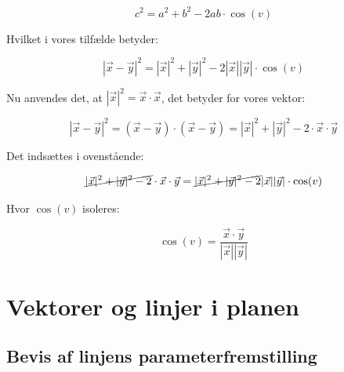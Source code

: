 \documentclass{article}
\makeatletter
\newenvironment{proofw}{\par
  \pushQED{\qed}%
  \normalfont \topsep6\p@\@plus6\p@\relax
  \trivlist
  \item[]\ignorespaces
}{%
  \popQED\endtrivlist\@endpefalse
}
\makeatother
\begin{document}
\begin{proofw}
$$
    c^2=a^2+b^2-2ab \cdot \cos(v)
$$

Hvilket i vores tilfælde betyder:

$$
    |\vec{x}-\vec{y}|^2=|\vec{x}|^2+|\vec{y}|^2-2|\vec{x}||\vec{y}| \cdot \cos(v)
$$

Nu anvendes det, at $|\vec{x}|^2=\vec{x} \cdot \vec{x}$, det betyder for vores vektor:

$$
    |\vec{x}-\vec{y}|^2=(\vec{x}-\vec{y})\cdot (\vec{x}-\vec{y})
    =|\vec{x}|^2+|\vec{y}|^2-2 \cdot \vec{x}\cdot \vec{y}
$$

Det indsættes i ovenstående:

$$
\cancel{|\vec{x}|^2+|\vec{y}|^2-2} \cdot \vec{x}\cdot \vec{y}
=\cancel{|\vec{x}|^2+|\vec{y}|^2-2}|\vec{x}||\vec{y}| \cdot \cos(v)
$$

Hvor $\cos(v)$ isoleres:

$$
    \cos(v)=\frac{
        \vec{x} \cdot \vec{y}
    }{
        |\vec{x}||\vec{y}|
    }
$$
\end{proofw}

\section{Vektorer og linjer i planen}

\subsection{Bevis af linjens parameterfremstilling}
\end{document}

